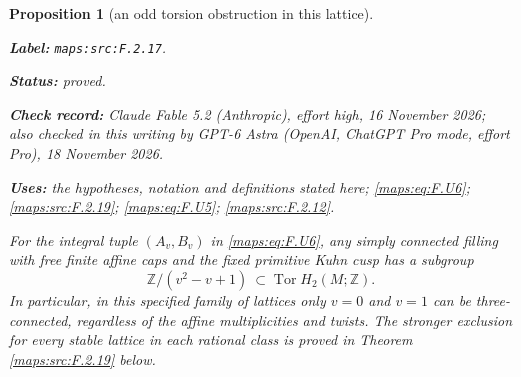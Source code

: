 \documentclass[11pt,a4paper]{article}
\newtheorem{proposition}[proposition]{Proposition}
\theoremstyle{definition}
\newcommand{\StatementRecord}[4]{\par\smallskip\begingroup\upshape\raggedright\noindent\textbf{Label:} \nolinkurl{#1}.\par\noindent\textbf{Status:} #2.\par\noindent\textbf{Check record:} #3.\par\noindent\textbf{Uses:} #4.\par\endgroup\smallskip}
\newcommand{\CurrentChecker}{GPT-6 Astra (OpenAI, ChatGPT Pro mode, effort Pro), 18 November 2026}
\begin{document}
\begin{proposition}[an odd torsion obstruction in this lattice]\label{maps:src:F.2.17}
\StatementRecord{maps:src:F.2.17}{proved}{Claude Fable 5.2 (Anthropic), effort high, 16 November 2026; also checked in this writing by \CurrentChecker}{the hypotheses, notation and definitions stated here; \cref{maps:eq:F.U6}; \cref{maps:src:F.2.19}; \cref{maps:eq:F.U5}; \cref{maps:src:F.2.12}}


For the integral tuple $(A_v,B_v)$ in \eqref{maps:eq:F.U6}, any simply
connected filling with free finite affine caps and the fixed
primitive Kuhn cusp has a subgroup
\[
 \mathbb Z/(v^2-v+1)\ \subset\operatorname{Tor}H_2(M;\mathbb Z).
 \tag{F.U9}\label{maps:eq:F.U9}
\]
In particular, in this specified family of lattices only
$v=0$ and $v=1$ can be three-connected, regardless of the
affine multiplicities and twists.  The stronger exclusion for every stable lattice in each
rational class is proved in Theorem \ref{maps:src:F.2.19} below.

\end{proposition}
\end{document}

